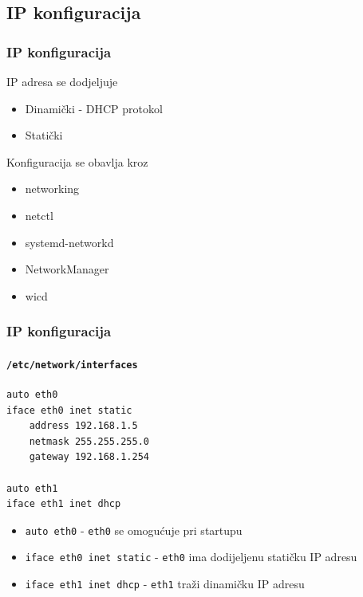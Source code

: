 \documentclass[t,table,usenames,dvipsnames]{beamer}
\begin{document}
\subsection{IP konfiguracija}

\begin{frame}
	\frametitle{IP konfiguracija}
	IP adresa se dodjeljuje
	\begin{itemize}
		\item Dinamički - DHCP protokol
		\item Statički
	\end{itemize}
	\vspace{1em}
	Konfiguracija se obavlja kroz
	\begin{itemize}
		\item networking
		\item netctl
		\item systemd-networkd
	\end{itemize}
	\begin{itemize}
		\item NetworkManager
		\item wicd
	\end{itemize}
\end{frame}

\begin{frame}[fragile]
	\frametitle{IP konfiguracija}
	\framesubtitle{\texttt{/etc/network/interfaces}}
	\vspace{-1em}
	\begin{verbatim}
auto eth0
iface eth0 inet static
    address 192.168.1.5
    netmask 255.255.255.0
    gateway 192.168.1.254

auto eth1
iface eth1 inet dhcp
	\end{verbatim}
	\begin{itemize}
		\item \texttt{auto eth0} - \texttt{eth0} se omogućuje pri startupu
		\item \texttt{iface eth0 inet static} - \texttt{eth0} ima dodijeljenu statičku IP adresu
		\item \texttt{iface eth1 inet dhcp} - \texttt{eth1} traži dinamičku IP adresu
	\end{itemize}
\end{frame}
\end{document}
